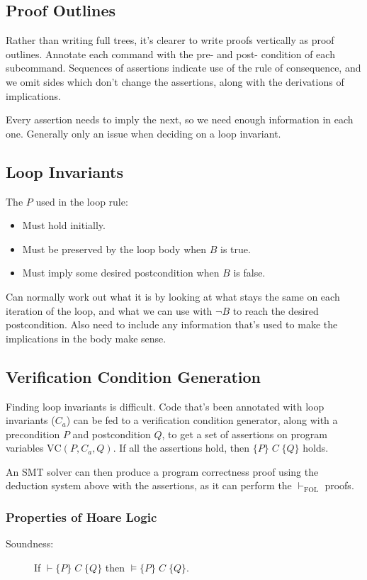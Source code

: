 \documentclass[a4paper, 11pt]{article}
\newcommand{\triple}[3]{\{#1\}\;#2\;\{#3\}}
\newcommand{\triplem}[3]{\(\triple{#1}{#2}{#3}\)}
\begin{document}
{    \subsection*{Proof Outlines}
    {
        Rather than writing full trees, it's clearer to write proofs vertically as proof outlines. Annotate each command with the pre- and post- condition of each subcommand. Sequences of assertions indicate use of the rule of consequence, and we omit sides which don't change the assertions, along with the derivations of implications.

        Every assertion needs to imply the next, so we need enough information in each one. Generally only an issue when deciding on a loop invariant.
    }
    \subsection*{Loop Invariants}
    {
        The \(P\) used in the loop rule:
        \begin{itemize}
        \item Must hold initially.
        \item Must be preserved by the loop body when \(B\) is true.
        \item Must imply some desired postcondition when \(B\) is false.
        \end{itemize}

        Can normally work out what it is by looking at what stays the same on each iteration of the loop, and what we can use with \(\neg B\) to reach the desired postcondition. Also need to include any information that's used to make the implications in the body make sense.
    }
    \subsection*{Verification Condition Generation}
    {
        Finding loop invariants is difficult. Code that's been annotated with loop invariants (\(C_a\)) can be fed to a verification condition generator, along with a precondition \(P\) and postcondition \(Q\), to get a set of assertions on program variables \(\text{VC}(P,C_a,Q)\). If all the assertions hold, then \triplem{P}{C}{Q} holds.

        An SMT solver can then produce a program correctness proof using the deduction system above with the assertions, as it can perform the \(\vdash_\text{FOL}\) proofs.
    }
    \subsubsection*{Properties of Hoare Logic}
    {
        \begin{description}
        \item[Soundness:]
        {
            If \(\vdash\triple{P}{C}{Q}\) then \(\vDash\triple{P}{C}{Q}\).

}
\end{description}}}
\end{document}
